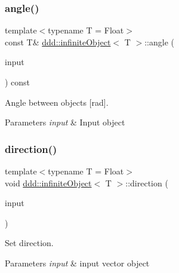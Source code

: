 \subsubsection{\texorpdfstring{angle()}{angle()}}
{\footnotesize\ttfamily template$<$typename T = Float$>$ \\
const T\& \hyperlink{classddd_1_1infinite_object}{ddd\+::infinite\+Object}$<$ T $>$\+::angle (\begin{DoxyParamCaption}\item[{const \hyperlink{classddd_1_1infinite_object}{infinite\+Object}$<$ T $>$ \&}]{input }\end{DoxyParamCaption}) const\hspace{0.3cm}{\ttfamily [inline]}}



Angle between objects \mbox{[}rad\mbox{]}. 


\begin{DoxyParams}{Parameters}
{\em input} & Input object \\
\hline
\end{DoxyParams}
\mbox{\label{classddd_1_1infinite_object_a1940ac3d87fc2ca742ca036c866736e8}} 
\subsubsection{\texorpdfstring{direction()}{direction()}}
{\footnotesize\ttfamily template$<$typename T = Float$>$ \\
void \hyperlink{classddd_1_1infinite_object}{ddd\+::infinite\+Object}$<$ T $>$\+::direction (\begin{DoxyParamCaption}\item[{const \hyperlink{classddd_1_1vector}{vector}$<$ T $>$ \&}]{input }\end{DoxyParamCaption})\hspace{0.3cm}{\ttfamily [inline]}}



Set direction. 


\begin{DoxyParams}{Parameters}
{\em input} & input vector object \\
\hline
\end{DoxyParams}
\mbox{\label{classddd_1_1infinite_object_a64089c7dadb2ec0b414b155f5bd43339}} 
